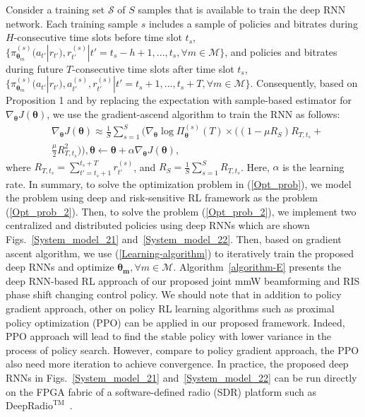 \documentclass[conference]{IEEEtran}
\begin{document}
Consider a training set $\mathcal{S}$ of $S$ samples that is available to train the deep RNN network. Each training sample $s$ includes a sample of policies and bitrates during $H$-consecutive time slots before time slot $t_s$, $\{\pi_{\boldsymbol{\theta}_m}^{(s)}(a_{t'}|r_{t'}),r_{t'}^{(s)}|t'=t_s-h+1,...,t_s, \forall m\in \mathcal{M} \}$, and policies and bitrates during future $T$-consecutive time slots after time slot $t_s$,
$\{\pi_{\boldsymbol{\theta}_m}^{(s)}(a_{t'}|r_{t'}),a_{t'}^{(s)},r_{t'}^{(s)}|t'=t_s+1,...,t_{s}+T, \forall m\in \mathcal{M}\}$. Consequently, based on Proposition 1 and by replacing the expectation with sample-based estimator for $\nabla_{\boldsymbol{\theta}}J(\boldsymbol{\theta})$, we use the gradient-ascend algorithm to train the RNN  as follows:
\begin{align}
& \nabla_{\boldsymbol{\theta}}J(\boldsymbol{\theta})\approx \frac{1}{S}\sum_{s=1}^S \Big(\nabla_{\boldsymbol{\theta}}\log\Pi_{\boldsymbol{\theta}}^{(s)}(T) \times \big((1-\mu R_S) R_{T,t_s}+\nonumber \\ &\frac{\mu}{2}R_{T,t_s}^2\big)\Big),
\boldsymbol{\theta}\leftarrow \boldsymbol{\theta}+\alpha \nabla_{\boldsymbol{\theta}}J(\boldsymbol{\theta}), \label{Learning-algorithm}
\end{align}
where $R_{T,t_s}=\sum_{t'=t_s+1}^{t_s+T} r_{t'}^{(s)}$, and $R_S=\frac{1}{S}\sum_{s=1}^S R_{T,t_s}$. Here, $\alpha$ is the learning rate. In summary, to solve the optimization problem in (\ref{Opt_prob}), we model the problem using deep and risk-sensitive RL framework as the problem (\ref{Opt_prob_2}). Then, to solve the problem (\ref{Opt_prob_2}), we implement two centralized and distributed policies using deep RNNs which are shown Figs.~\ref{System_model_21} and~\ref{System_model_22}. Then, based on gradient ascent algorithm, we use (\ref{Learning-algorithm}) to iteratively train the proposed deep RNNs and optimize $\boldsymbol{\theta_m},\forall m \in \mathcal{M}$. Algorithm~\ref{algorithm-E}  presents the deep RNN-based RL approach of our proposed joint mmW beamforming and RIS phase shift changing control policy. We should note that in addition to policy gradient approach, other on policy RL learning algorithms such as proximal policy optimization (PPO) can be applied in our proposed framework. Indeed, PPO approach will lead to find the stable policy with lower variance in the process of policy search. However, compare to policy gradient approach, the PPO also need more iteration to achieve convergence. In practice, the proposed deep RNNs in Figs.~\ref{System_model_21} and~\ref{System_model_22} can be run directly on the FPGA fabric of a software-defined radio (SDR) platform such as $\text{DeepRadio}^{\text{TM}}$~\cite{9082619}.
\vspace{-0.2cm}
\end{document}
